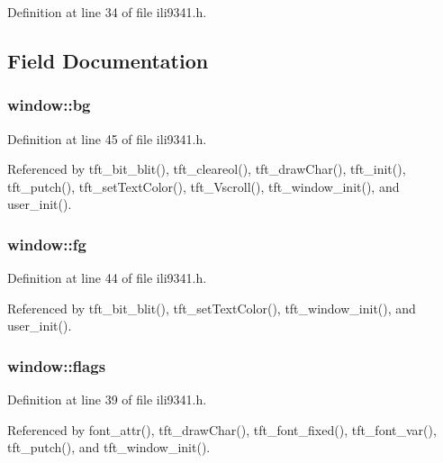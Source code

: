 Definition at line 34 of file ili9341.\-h.



\subsection{Field Documentation}
\hypertarget{structwindow_affcf5d29153103c2537542f5a4f8ba87}{
\subsubsection[{bg}]{ window\-::bg}}\label{structwindow_affcf5d29153103c2537542f5a4f8ba87}


Definition at line 45 of file ili9341.\-h.



Referenced by tft\-\_\-bit\-\_\-blit(), tft\-\_\-cleareol(), tft\-\_\-draw\-Char(), tft\-\_\-init(), tft\-\_\-putch(), tft\-\_\-set\-Text\-Color(), tft\-\_\-\-Vscroll(), tft\-\_\-window\-\_\-init(), and user\-\_\-init().

\hypertarget{structwindow_ac8739cdb3c50efcc1deaa5ab955a5e62}{
\subsubsection[{fg}]{ window\-::fg}}\label{structwindow_ac8739cdb3c50efcc1deaa5ab955a5e62}


Definition at line 44 of file ili9341.\-h.



Referenced by tft\-\_\-bit\-\_\-blit(), tft\-\_\-set\-Text\-Color(), tft\-\_\-window\-\_\-init(), and user\-\_\-init().

\hypertarget{structwindow_ad58fae853f87093ef4f0139df0a3f33d}{
\subsubsection[{flags}]{ window\-::flags}}\label{structwindow_ad58fae853f87093ef4f0139df0a3f33d}


Definition at line 39 of file ili9341.\-h.



Referenced by font\-\_\-attr(), tft\-\_\-draw\-Char(), tft\-\_\-font\-\_\-fixed(), tft\-\_\-font\-\_\-var(), tft\-\_\-putch(), and tft\-\_\-window\-\_\-init().

